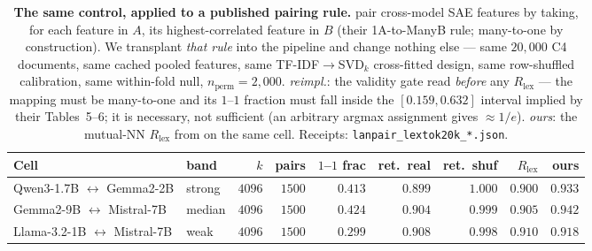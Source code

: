 \begin{table}[h]
\centering
\caption{\textbf{The same control, applied to a published pairing rule.} \citet{lan2024universal} pair cross-model SAE features by taking, for each feature in $A$, its highest-correlated feature in $B$ (their 1A-to-ManyB rule; many-to-one by construction). We transplant \emph{that rule} into the  pipeline and change nothing else --- same $20{,}000$ C4 documents, same cached pooled features, same TF-IDF$\to$SVD$_k$ cross-fitted design, same row-shuffled calibration, same within-fold null, $n_{\text{perm}}{=}2{,}000$. \emph{reimpl.}: the validity gate read \emph{before} any $R_{\text{lex}}$ --- the mapping must be many-to-one and its $1$--$1$ fraction must fall inside the $[0.159,0.632]$ interval implied by their Tables~5--6; it is necessary, not sufficient (an arbitrary argmax assignment gives $\approx 1/e$). \emph{ours}: the mutual-NN $R_{\text{lex}}$ from  on the same cell. Receipts: \texttt{lanpair\_lextok20k\_*.json}.}
\label{tab:lanpair}
\footnotesize
\setlength{\tabcolsep}{4pt}
\begin{tabular}{llrrrrrrr}
\toprule
Cell & band & $k$ & pairs & $1$--$1$ frac & ret.\ real & ret.\ shuf & $R_{\text{lex}}$ & ours \\
\midrule
Qwen3-1.7B $\leftrightarrow$ Gemma2-2B & strong & $4096$ & $1500$ & $0.413$ & $0.899$ & $1.000$ & $0.900$ & $0.933$ \\
Gemma2-9B $\leftrightarrow$ Mistral-7B & median & $4096$ & $1500$ & $0.424$ & $0.904$ & $0.999$ & $0.905$ & $0.942$ \\
Llama-3.2-1B $\leftrightarrow$ Mistral-7B & weak & $4096$ & $1500$ & $0.299$ & $0.908$ & $0.998$ & $0.910$ & $0.918$ \\
\bottomrule
\end{tabular}
\end{table}
